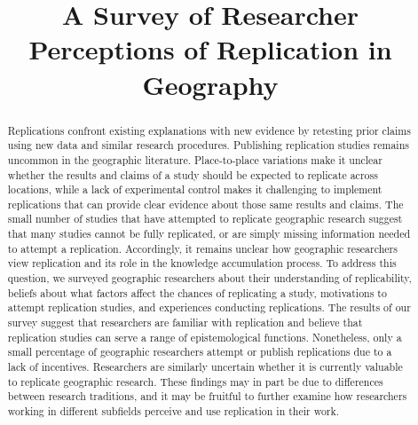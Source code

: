 \documentclass[]{interact}
\theoremstyle{plain}%
\theoremstyle{definition}
\theoremstyle{remark}
\begin{document}

\title{A Survey of Researcher Perceptions of Replication in Geography}

\author{
}

\maketitle

\begin{abstract}
Replications confront existing explanations with new evidence by retesting prior claims using new data and similar research procedures. 
Publishing replication studies remains uncommon in the geographic literature. 
Place-to-place variations make it unclear whether the results and claims of a study should be expected to replicate across locations, while a lack of experimental control makes it challenging to implement replications that can provide clear evidence about those same results and claims.
The small number of studies that have attempted to replicate geographic research suggest that many studies cannot be fully replicated, or are simply missing information needed to attempt a replication. 
Accordingly, it remains unclear how geographic researchers view replication and its role in the knowledge accumulation process.
To address this question, we surveyed geographic researchers about their understanding of replicability, beliefs about what factors affect the chances of replicating a study, motivations to attempt replication studies, and experiences conducting replications. 
The results of our survey suggest that researchers are familiar with replication and believe that replication studies can serve a range of epistemological functions. 
Nonetheless, only a small percentage of geographic researchers attempt or publish replications due to a lack of incentives. 
Researchers are similarly uncertain whether it is currently valuable to replicate geographic research.
These findings may in part be due to differences between research traditions, and it may be fruitful to further examine how researchers working in different subfields perceive and use replication in their work. 
\end{abstract}
\end{document}
